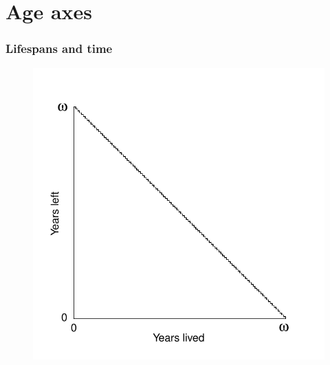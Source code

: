 \documentclass{beamer}
\begin{document}
\section{Age axes}


\begin{frame}
\frametitle{Lifespans and time}
\vspace{-1cm}
\begin{figure}
\includegraphics[scale=.7]{Figures/Triangle1}
\end{figure}
\end{frame}
\end{document}
